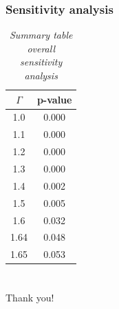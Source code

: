 \documentclass[10pt, handout]{beamer} %
\begin{document}
\frame
{
\frametitle{Sensitivity analysis}
\vskip 0.1in  

\begin{table}[!ht] %
\centering
\caption{\textsl{Summary table overall sensitivity analysis}}
\label{Table-1}
\begin{tabular}{|c|c|}
\hline
$\Gamma$ & p-value \\
\hline
1.0 & 0.000 \\
\hline
1.1 & 0.000 \\
\hline
1.2 & 0.000 \\
\hline
1.3 & 0.000 \\
\hline
1.4 & 0.002 \\
\hline
1.5 & 0.005 \\
\hline
1.6 & 0.032 \\
\hline
1.64 & 0.048 \\
\hline
1.65 & 0.053 \\
\hline
\end{tabular}
\end{table}
}

\section*{}
\frame
{
\frametitle{}

\vskip 0.1in

\begin{center}
Thank you!
\end{center}
}
\end{document}
